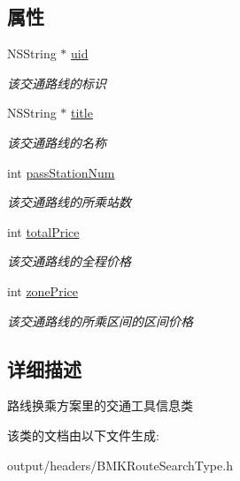\subsection*{属性}
\begin{DoxyCompactItemize}
\item 
\hypertarget{interface_b_m_k_vehicle_info_a17283dfe6370d707ab8a8260b5728428}{}N\+S\+String $\ast$ \hyperlink{interface_b_m_k_vehicle_info_a17283dfe6370d707ab8a8260b5728428}{uid}\label{interface_b_m_k_vehicle_info_a17283dfe6370d707ab8a8260b5728428}

\begin{DoxyCompactList}\small\item\em 该交通路线的标识 \end{DoxyCompactList}\item 
\hypertarget{interface_b_m_k_vehicle_info_ad188d1a1f9f87b507098f3190275964e}{}N\+S\+String $\ast$ \hyperlink{interface_b_m_k_vehicle_info_ad188d1a1f9f87b507098f3190275964e}{title}\label{interface_b_m_k_vehicle_info_ad188d1a1f9f87b507098f3190275964e}

\begin{DoxyCompactList}\small\item\em 该交通路线的名称 \end{DoxyCompactList}\item 
\hypertarget{interface_b_m_k_vehicle_info_a328104a4b6f915fe8654325ddd7de287}{}int \hyperlink{interface_b_m_k_vehicle_info_a328104a4b6f915fe8654325ddd7de287}{pass\+Station\+Num}\label{interface_b_m_k_vehicle_info_a328104a4b6f915fe8654325ddd7de287}

\begin{DoxyCompactList}\small\item\em 该交通路线的所乘站数 \end{DoxyCompactList}\item 
\hypertarget{interface_b_m_k_vehicle_info_a2167884d0d65e0f1bfa8b51215f31ba2}{}int \hyperlink{interface_b_m_k_vehicle_info_a2167884d0d65e0f1bfa8b51215f31ba2}{total\+Price}\label{interface_b_m_k_vehicle_info_a2167884d0d65e0f1bfa8b51215f31ba2}

\begin{DoxyCompactList}\small\item\em 该交通路线的全程价格 \end{DoxyCompactList}\item 
\hypertarget{interface_b_m_k_vehicle_info_ac880b4af4c7e2e9f622720e7488ef3c7}{}int \hyperlink{interface_b_m_k_vehicle_info_ac880b4af4c7e2e9f622720e7488ef3c7}{zone\+Price}\label{interface_b_m_k_vehicle_info_ac880b4af4c7e2e9f622720e7488ef3c7}

\begin{DoxyCompactList}\small\item\em 该交通路线的所乘区间的区间价格 \end{DoxyCompactList}\end{DoxyCompactItemize}


\subsection{详细描述}
路线换乘方案里的交通工具信息类 

该类的文档由以下文件生成\+:\begin{DoxyCompactItemize}
\item 
output/headers/B\+M\+K\+Route\+Search\+Type.\+h\end{DoxyCompactItemize}
